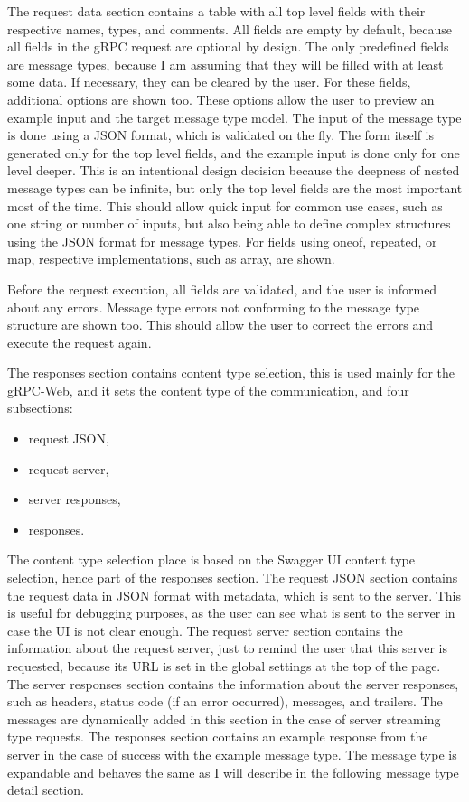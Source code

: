 The request data section contains a table with all top level fields with their respective names, types, and comments.
All fields are empty by default, because all fields in the gRPC request are optional by design.
The only predefined fields are message types, because I am assuming that they will be filled with at least some data.
If necessary, they can be cleared by the user.
For these fields, additional options are shown too.
These options allow the user to preview an example input and the target message type model.
The input of the message type is done using a JSON format, which is validated on the fly.
The form itself is generated only for the top level fields, and the example input is done only for one level deeper.
This is an intentional design decision because the deepness of nested message types can be infinite, but only the top level fields are the most important most of the time.
This should allow quick input for common use cases, such as one string or number of inputs, but also being able to define complex structures using the JSON format for message types.
For fields using oneof, repeated, or map, respective implementations, such as array, are shown.

Before the request execution, all fields are validated, and the user is informed about any errors.
Message type errors not conforming to the message type structure are shown too.
This should allow the user to correct the errors and execute the request again.

The responses section contains content type selection, this is used mainly for the gRPC-Web, and it sets the content type of the communication, and four subsections:
\begin{itemize}
    \item request JSON,
    \item request server,
    \item server responses,
    \item responses.
\end{itemize}

The content type selection place is based on the Swagger UI content type selection, hence part of the responses section.
The request JSON section contains the request data in JSON format with metadata, which is sent to the server.
This is useful for debugging purposes, as the user can see what is sent to the server in case the UI is not clear enough.
The request server section contains the information about the request server, just to remind the user that this server is requested, because its URL is set in the global settings at the top of the page.
The server responses section contains the information about the server responses, such as headers, status code (if an error occurred), messages, and trailers.
The messages are dynamically added in this section in the case of server streaming type requests.
The responses section contains an example response from the server in the case of success with the example message type.
The message type is expandable and behaves the same as I will describe in the following message type detail section.


